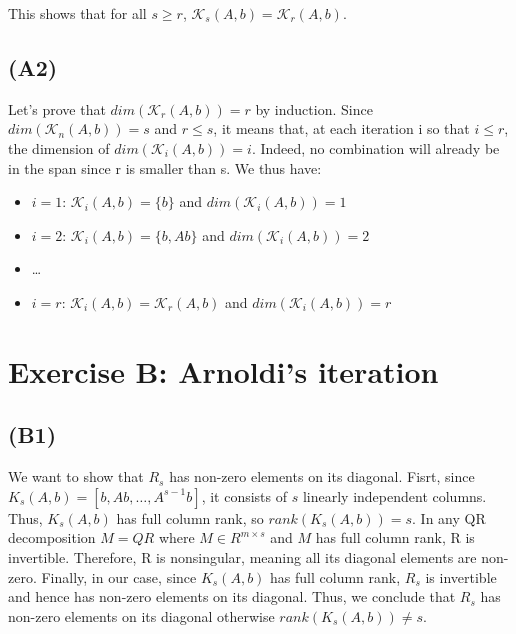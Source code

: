 \documentclass{article}
\begin{document}
This shows that for all $s\geq r$, $\mathcal{K}_{s}(A,b) = \mathcal{K}_{r}(A,b) $.


\subsection*{(A2)}
Let's prove that $ dim( \mathcal{K}_r (A,b)) = r$ by induction. Since $ dim( \mathcal{K}_n (A,b)) = s$ and $r \leq s$, it means that, 
at each iteration i so that $i \leq r$, the dimension of  $ dim( \mathcal{K}_i (A,b)) = i$. Indeed, no combination will already be in the span
since r is smaller than s. 
We thus have:
\begin{itemize}
    \item $i = 1$: $ \mathcal{K}_i (A,b) = \{b\}$ and $dim( \mathcal{K}_i (A,b)) = 1$
    \item $i = 2$: $ \mathcal{K}_i (A,b) = \{b, Ab\}$ and $dim( \mathcal{K}_i (A,b)) = 2$
    \item \dots
    \item $i = r$: $ \mathcal{K}_i (A,b) = \mathcal{K}_r (A,b) $ and $dim( \mathcal{K}_i (A,b)) = r$
\end{itemize}

\section{Exercise B: Arnoldi’s iteration}
\subsection*{(B1)}
We want to show that $ R_s $ has non-zero elements on its diagonal.
Fisrt, since $ K_s(A, b) = [b, Ab, \dots, A^{s-1}b] $, it consists of $ s $ linearly independent columns. Thus, $ K_s(A, b) $ has full column rank,
 so $ rank(K_s(A, b)) = s $.
In any QR decomposition $ M = QR$ where $ M \in R^{m \times s} $ and $ M $ has full column rank, R is invertible. 
Therefore, R is nonsingular, meaning all its diagonal elements are non-zero.
Finally, in our case, since $ K_s(A, b) $ has full column rank, $R_s $ is invertible and hence has non-zero elements on its diagonal.
Thus, we conclude that $ R_s $ has non-zero elements on its diagonal otherwise $rank(K_s (A,b)) \neq s$.
\end{document}
